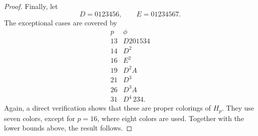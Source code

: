\begin{proof}
Finally, let
\[
D=0123456,\qquad E=01234567.
\]
The exceptional cases are covered by
\[
\begin{array}{c|c}
p&\phi\\ \hline
13&D201534\\
14&D^2\\
16&E^2\\
19&D^2A\\
21&D^3\\
26&D^3A\\
31&D^4\,234.
\end{array}
\]
Again, a direct verification shows that these are proper colorings of
$H_p$. They use seven colors, except for $p=16$, where eight colors
are used. Together with the lower bounds above, the result follows.
\end{proof}